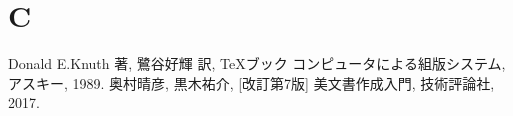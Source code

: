 \documentclass[titlepage, a4paper, 11pt, dvipdfmx]{jsarticle}
\theoremstyle{definition}
\begin{document}
\section{C}
\TQBF \TQBF \TQBF \TQBF \TQBF \TQBF \TQBF \TQBF
\TQBF \TQBF \TQBF \TQBF \TQBF \TQBF \TQBF \TQBF
\TQBF \TQBF \TQBF \TQBF \TQBF \TQBF \TQBF \TQBF
\TQBF \TQBF \TQBF \TQBF \TQBF \TQBF \TQBF \TQBF
\TQBF \TQBF \TQBF \TQBF \TQBF \TQBF \TQBF \TQBF
\TQBF \TQBF \TQBF \TQBF \TQBF \TQBF \TQBF \TQBF
\TQBF \TQBF \TQBF \TQBF \TQBF \TQBF \TQBF \TQBF
\TQBF \TQBF \TQBF \TQBF \TQBF \TQBF \TQBF \TQBF
\TQBF \TQBF \TQBF \TQBF \TQBF \TQBF \TQBF \TQBF
\TQBF \TQBF \TQBF \TQBF \TQBF \TQBF \TQBF \TQBF
\TQBF \TQBF \TQBF \TQBF \TQBF \TQBF \TQBF \TQBF
\TQBF \TQBF \TQBF \TQBF \TQBF \TQBF \TQBF \TQBF
\TQBF \TQBF \TQBF \TQBF \TQBF \TQBF \TQBF \TQBF
\TQBF \TQBF \TQBF \TQBF \TQBF \TQBF \TQBF \TQBF
\begin{thebibliography}{1}
     Donald E.Knuth 著, 鷺谷好輝 訳, \TeX ブック コンピュータによる組版システム, アスキー, 1989.
     奥村晴彦, 黒木祐介, [改訂第7版] \LaTeXe 美文書作成入門, 技術評論社, 2017.
\end{thebibliography}
\end{document}

